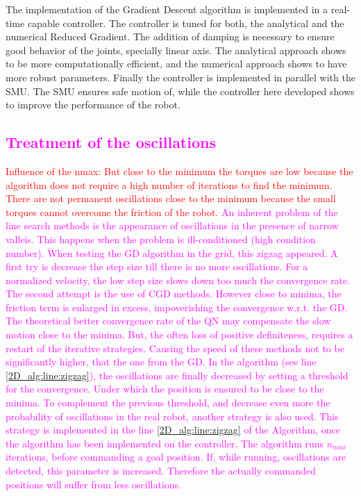 The implementation of the Gradient Descent algorithm is implemented in a real-time capable controller. The controller is tuned for both, the analytical and the numerical Reduced Gradient. The addition of damping is necessary to ensure good behavior of the joints, specially linear axis. The analytical approach shows to be more computationally efficient, and the numerical approach shows to have more robust parameters.
Finally the controller is implemented in parallel with the SMU. The SMU ensures safe motion of, while the controller here developed shows to improve the performance of the robot.


\textcolor{magenta}{\section{Treatment of the oscillations}
\label{sec:oscillations_conclusions}
%
\textcolor{red}{Influence of the nmax: But close to the minimum the torques are low because the algorithm does not require a high number of iterations to find the minimum. There are not permanent oscillations close to the minimum because the small torques cannot overcome the friction of the robot. }
%
An inherent problem of the line search methods is the appearance of oscillations in the presence of narrow valleis. This happens when the problem is ill-conditioned (high condition number). 
%
When testing the GD algorithm in the grid, this zigzag appeared. A first try is decrease the step size till there is no more oscillations. For a normalized velocity, the low step size slows down too much the convergence rate.
%
The second attempt is the use of CGD methods. However close to minima, the friction term is enlarged in excess, impoverishing the convergence w.r.t. the GD.
%
The theoretical better convergence rate of the QN may compensate the slow motion close to the minima. But, the often loss of positive definiteness, requires a restart of the iterative strategies. Causing the speed of these methods not to be significantly higher, that the one from the GD.
%
In the algorithm (see line \ref{2D_alg:line:zigzag}), the oscillations are finally decreased by setting a threshold for the convergence. Under which the position is ensured to be close to the minima.
%
To complement the previous threshold, and decrease even more the probability of oscillations in the real robot, another strategy is also used. This strategy is implemented in the line \ref{2D_alg:line:zigzag} of the Algorithm, once the algorithm has been implemented on the controller. The algorithm runs $n_{max}$ iterations, before commanding a goal position. If, while running, oscillations are detected, this parameter is increased.  Therefore the actually commanded positions will suffer from less oscillations. 
}

